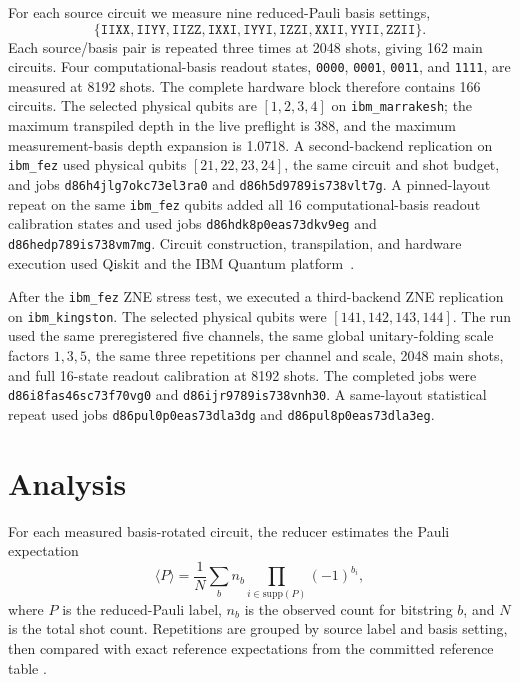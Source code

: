\documentclass[preprint,aps,physrev,superscriptaddress,floatfix,longbibliography]{revtex4-2}
\begin{document}
For each source circuit we measure nine reduced-Pauli basis settings,
\begin{equation}
\{\texttt{IIXX},\texttt{IIYY},\texttt{IIZZ},\texttt{IXXI},\texttt{IYYI},
\texttt{IZZI},\texttt{XXII},\texttt{YYII},\texttt{ZZII}\}.
\end{equation}
Each source/basis pair is repeated three times at 2048 shots, giving 162 main
circuits. Four computational-basis readout states, \texttt{0000},
\texttt{0001}, \texttt{0011}, and \texttt{1111}, are measured at 8192 shots.
The complete hardware block therefore contains 166 circuits. The selected
physical qubits are $[1,2,3,4]$ on \texttt{ibm\_marrakesh}; the maximum
transpiled depth in the live preflight is 388, and the maximum
measurement-basis depth expansion is 1.0718. A second-backend replication on
\texttt{ibm\_fez} used physical qubits $[21,22,23,24]$, the same circuit and
shot budget, and jobs \texttt{d86h4jlg7okc73el3ra0} and
\texttt{d86h5d9789is738vlt7g}. A pinned-layout repeat on the same
\texttt{ibm\_fez} qubits added all 16 computational-basis readout calibration
states and used jobs \texttt{d86hdk8p0eas73dkv9eg} and
\texttt{d86hedp789is738vm7mg}. Circuit construction, transpilation, and
hardware execution used Qiskit and the IBM Quantum
platform~\cite{Qiskit2024,IBMQuantum}.

After the \texttt{ibm\_fez} ZNE stress test, we executed a third-backend ZNE
replication on \texttt{ibm\_kingston}. The selected physical qubits were
$[141,142,143,144]$. The run used the same preregistered five channels, the
same global unitary-folding scale factors $1,3,5$, the same three repetitions
per channel and scale, 2048 main shots, and full 16-state readout calibration
at 8192 shots. The completed jobs were \texttt{d86i8fas46sc73f70vg0} and
\texttt{d86ijr9789is738vnh30}. A same-layout statistical repeat used jobs
\texttt{d86pul0p0eas73dla3dg} and \texttt{d86pul8p0eas73dla3eg}.

\section{Analysis}

For each measured basis-rotated circuit, the reducer estimates the Pauli
expectation
\begin{equation}
  \langle P \rangle =
  \frac{1}{N}\sum_b n_b
  \prod_{i\in \mathrm{supp}(P)} (-1)^{b_i},
\end{equation}
where $P$ is the reduced-Pauli label, $n_b$ is the observed count for bitstring
$b$, and $N$ is the total shot count. Repetitions are grouped by source label
and basis setting, then compared with exact reference expectations from the
committed reference table
.
\end{document}
